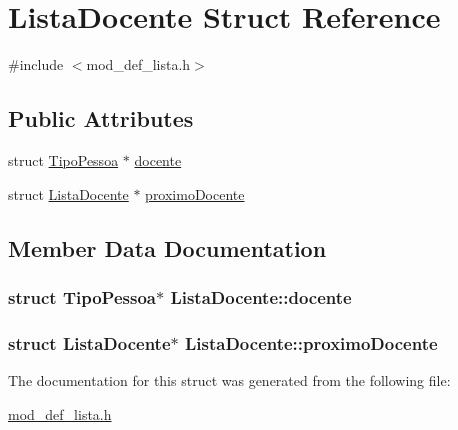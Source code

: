 \hypertarget{structListaDocente}{\section{Lista\+Docente Struct Reference}
\label{structListaDocente}
}


{\ttfamily \#include $<$mod\+\_\+def\+\_\+lista.\+h$>$}

\subsection*{Public Attributes}
\begin{DoxyCompactItemize}
\item 
struct \hyperlink{structTipoPessoa}{Tipo\+Pessoa} $\ast$ \hyperlink{structListaDocente_a23381e4037937b58a9727cdd73a3270e}{docente}
\item 
struct \hyperlink{structListaDocente}{Lista\+Docente} $\ast$ \hyperlink{structListaDocente_a9cf9c618233522b30c3c0105cd3ead72}{proximo\+Docente}
\end{DoxyCompactItemize}


\subsection{Member Data Documentation}
\hypertarget{structListaDocente_a23381e4037937b58a9727cdd73a3270e}{
\subsubsection[{docente}]{\setlength{\rightskip}{0pt plus 5cm}struct {\bf Tipo\+Pessoa}$\ast$ Lista\+Docente\+::docente}}\label{structListaDocente_a23381e4037937b58a9727cdd73a3270e}
\hypertarget{structListaDocente_a9cf9c618233522b30c3c0105cd3ead72}{
\subsubsection[{proximo\+Docente}]{\setlength{\rightskip}{0pt plus 5cm}struct {\bf Lista\+Docente}$\ast$ Lista\+Docente\+::proximo\+Docente}}\label{structListaDocente_a9cf9c618233522b30c3c0105cd3ead72}


The documentation for this struct was generated from the following file\+:\begin{DoxyCompactItemize}
\item 
\hyperlink{mod__def__lista_8h}{mod\+\_\+def\+\_\+lista.\+h}\end{DoxyCompactItemize}
